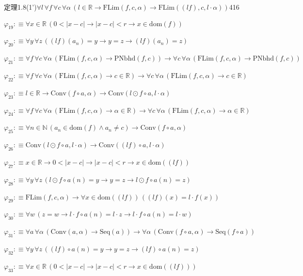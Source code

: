 \begin{fullproof}{定理1.8(1')}{$\forall l\,\forall f\,\forall c\,\forall \alpha\,(l \in \mathbb{R} \to \mathrm{FLim}(f,c,\alpha) \to \mathrm{FLim}((l f),c,l \cdot \alpha))$}{416}
\begin{abbrevlist}
\item $\varphi_{19} :\equiv \forall x \in \mathbb{R}\,(0 < \lvert x - c \rvert \to \lvert x - c \rvert < r \to x \in \mathrm{dom}(f))$
\item $\varphi_{20} :\equiv \forall y\,\forall z\,((l f)(a_{n}) = y \to y = z \to (l f)(a_{n}) = z)$
\item $\varphi_{21} :\equiv \forall f\,\forall c\,\forall \alpha\,(\mathrm{FLim}(f,c,\alpha) \to \mathrm{PNbhd}(f,c)) \to \forall c\,\forall \alpha\,(\mathrm{FLim}(f,c,\alpha) \to \mathrm{PNbhd}(f,c))$
\item $\varphi_{22} :\equiv \forall f\,\forall c\,\forall \alpha\,(\mathrm{FLim}(f,c,\alpha) \to c \in \mathbb{R}) \to \forall c\,\forall \alpha\,(\mathrm{FLim}(f,c,\alpha) \to c \in \mathbb{R})$
\item $\varphi_{23} :\equiv l \in \mathbb{R} \to \mathrm{Conv}(f \circ a,\alpha) \to \mathrm{Conv}(l \odot f \circ a,l \cdot \alpha)$
\item $\varphi_{24} :\equiv \forall f\,\forall c\,\forall \alpha\,(\mathrm{FLim}(f,c,\alpha) \to \alpha \in \mathbb{R}) \to \forall c\,\forall \alpha\,(\mathrm{FLim}(f,c,\alpha) \to \alpha \in \mathbb{R})$
\item $\varphi_{25} :\equiv \forall n \in \mathbb{N}\,(a_{n} \in \mathrm{dom}(f) \land a_{n} \neq c) \to \mathrm{Conv}(f \circ a,\alpha)$
\item $\varphi_{26} :\equiv \mathrm{Conv}(l \odot f \circ a,l \cdot \alpha) \to \mathrm{Conv}((l f) \circ a,l \cdot \alpha)$
\item $\varphi_{27} :\equiv x \in \mathbb{R} \to 0 < \lvert x - c \rvert \to \lvert x - c \rvert < r \to x \in \mathrm{dom}((l f))$
\item $\varphi_{28} :\equiv \forall y\,\forall z\,(l \odot f \circ a(n) = y \to y = z \to l \odot f \circ a(n) = z)$
\item $\varphi_{29} :\equiv \mathrm{FLim}(f,c,\alpha) \to \forall x \in \mathrm{dom}((l f))\,((l f)(x) = l \cdot f(x))$
\item $\varphi_{30} :\equiv \forall w\,(z = w \to l \cdot f \circ a(n) = l \cdot z \to l \cdot f \circ a(n) = l \cdot w)$
\item $\varphi_{31} :\equiv \forall a\,\forall \alpha\,(\mathrm{Conv}(a,\alpha) \to \mathrm{Seq}(a)) \to \forall \alpha\,(\mathrm{Conv}(f \circ a,\alpha) \to \mathrm{Seq}(f \circ a))$
\item $\varphi_{32} :\equiv \forall y\,\forall z\,((l f) \circ a(n) = y \to y = z \to (l f) \circ a(n) = z)$
\item $\varphi_{33} :\equiv \forall x \in \mathbb{R}\,(0 < \lvert x - c \rvert \to \lvert x - c \rvert < r \to x \in \mathrm{dom}((l f)))$

\end{abbrevlist}
\end{fullproof}
